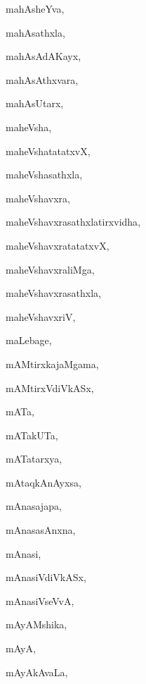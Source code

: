 \begin{multicols}{3}
{\noindent
{mahAsheYva}, \pageref{mahAsheYva}

\noindent
{mahAsathxla}, \pageref{mahAsathxla}

\noindent
{mahAsAdAKayx}, \pageref{mahAsAdAKayx}

\noindent
{mahAsAthxvara}, \pageref{mahAsAthxvara}

\noindent
{mahAsUtarx}, \pageref{mahAsUtarx}

\noindent
{maheVsha}, \pageref{maheVsha}

\noindent
{maheVshatatatxvX}, \pageref{maheVshatatatxvX}

\noindent
{maheVshasathxla}, \pageref{maheVshasathxla}

\noindent
{maheVshavxra}, \pageref{maheVshavxra}

\noindent
{maheVshavxrasathxlatirxvidha}, \pageref{maheVshavxrasathxlatirxvidha}

\noindent
{maheVshavxratatatxvX}, \pageref{maheVshavxratatatxvX}

\noindent
{maheVshavxraliMga}, \pageref{maheVshavxraliMga}

\noindent
{maheVshavxrasathxla}, \pageref{maheVshavxrasathxla}

\noindent
{maheVshavxriV}, \pageref{maheVshavxriV}

\noindent
{maLebage}, \pageref{maLebage}

\noindent
{mAMtirxkajaMgama}, \pageref{mAMtirxkajaMgama}

\noindent
{mAMtirxVdiVkASx}, \pageref{mAMtirxVdiVkASx}

\noindent
{mATa}, \pageref{mATa}

\noindent
{mATakUTa}, \pageref{mATakUTa}

\noindent
{mATatarxya}, \pageref{mATatarxya}

\noindent
{mAtaqkAnAyxsa}, \pageref{mAtaqkAnAyxsa}

\noindent
{mAnasajapa}, \pageref{mAnasajapa}

\noindent
{mAnasasAnxna}, \pageref{mAnasasAnxna}

\noindent
{mAnasi}, \pageref{mAnasi}

\noindent
{mAnasiVdiVkASx}, \pageref{mAnasiVdiVkASx}

\noindent
{mAnasiVseVvA}, \pageref{mAnasiVseVvA}

\noindent
{mAyAMshika}, \pageref{mAyAMshika}

\noindent
{mAyA}, \pageref{mAyA}

\noindent
{mAyAkAvaLa}, \pageref{mAyAkAvaLa}

}
\end{multicols}
